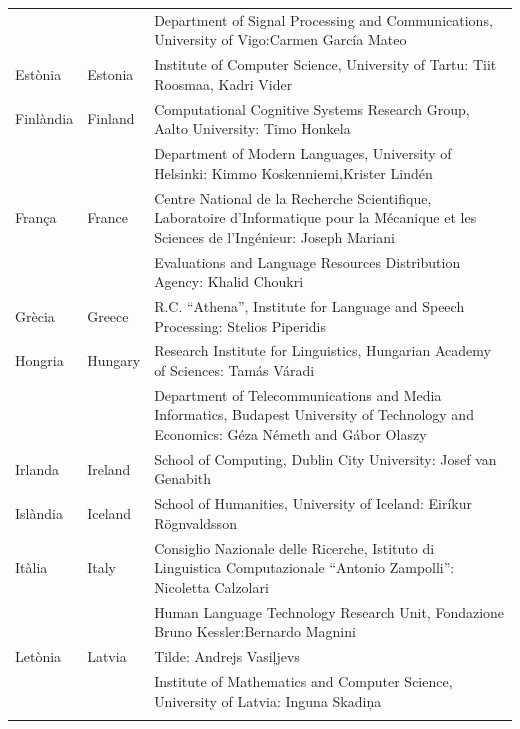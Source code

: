 \begin{longtable}{@{}llp{114mm}@{}}
  & & Department of Signal Processing and Communications, University of Vigo:\newline Carmen García Mateo \\ \addlinespace 
  Estònia & \textcolor{grey1}{Estonia} & Institute of Computer Science, University of Tartu: Tiit Roosmaa, Kadri Vider\\ \addlinespace
  Finlàndia & \textcolor{grey1}{Finland} & Computational Cognitive Systems Research Group, Aalto University: Timo Honkela\\ \addlinespace
  & & Department of Modern Languages, University of Helsinki: Kimmo Koskenniemi,\newline Krister Lindén \\ \addlinespace
  França & \textcolor{grey1}{France} & Centre National de la Recherche Scientifique, Laboratoire d'Informatique pour la Mécanique et les Sciences de l'Ingénieur: Joseph Mariani \\ \addlinespace
  & & Evaluations and Language Resources Distribution Agency: Khalid Choukri\\ \addlinespace 
  Grècia & \textcolor{grey1}{Greece} & R.C. “Athena”, Institute for Language and Speech Processing: Stelios Piperidis\\ \addlinespace
  Hongria & \textcolor{grey1}{Hungary} & Research Institute for Linguistics, Hungarian Academy of Sciences: Tamás Váradi\\  \addlinespace
  & & Department of Telecommunications and Media Informatics, Budapest University of Technology and Economics: Géza Németh and Gábor Olaszy\\ \addlinespace
  Irlanda & \textcolor{grey1}{Ireland} & School of Computing, Dublin City University: Josef van Genabith\\ \addlinespace
  Islàndia & \textcolor{grey1}{Iceland} & School of Humanities, University of Iceland: Eiríkur Rögnvaldsson\\ \addlinespace
  Itàlia & \textcolor{grey1}{Italy} & Consiglio Nazionale delle Ricerche, Istituto di Linguistica Computazionale “Antonio Zampolli”: Nicoletta Calzolari\\ \addlinespace
  & & Human Language Technology Research Unit, Fondazione Bruno Kessler:\newline Bernardo Magnini\\ \addlinespace 
  Letònia & \textcolor{grey1}{Latvia} & Tilde: Andrejs Vasiļjevs\\ \addlinespace 
  & & Institute of Mathematics and Computer Science, University of Latvia: Inguna Skadiņa\\ \addlinespace

\end{longtable}
